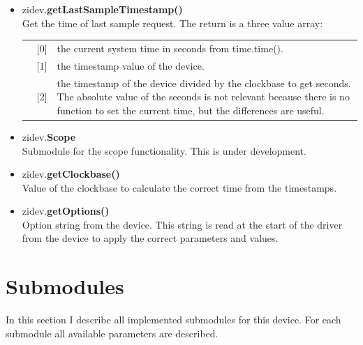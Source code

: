 \documentclass[11pt]{article} %
\begin{document}
\begin{itemize}
\item zidev.{\bf getLastSampleTimestamp()} \\
	Get the time of last sample request. The return is a three value array:
	\begin{longtable}{p{1.5cm}p{0.5cm}p{14.4cm}}
	& [0] & the current system time in seconds from time.time(). \\
	& [1] & the timestamp value of the device. \\
	& [2] & the timestamp of the device divided by the clockbase to get seconds. The absolute value of the seconds is not relevant because there is no function to set the current time, but the differences are useful. \\
	\end{longtable}

\item zidev.{\bf Scope} \\
  	Submodule for the scope functionality. This is under development.
 	
\item zidev.{\bf getClockbase()} \\
	Value of the clockbase to calculate the correct time from the timestamps.

\item zidev.{\bf getOptions()} \\
	Option string from the device. This string is read at the start of the driver from the device to apply the correct parameters and values.
  
\end{itemize}


\section{Submodules}

In this section I describe all implemented submodules for this device. For each submodule all available parameters are described.
\end{document}
